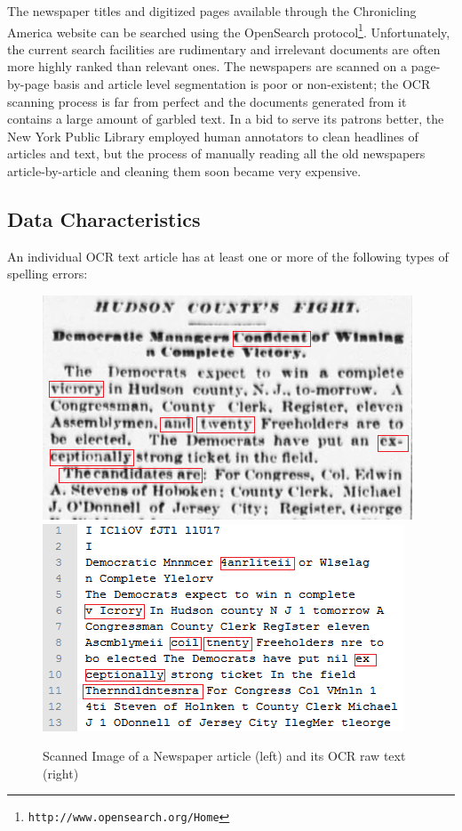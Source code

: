 \documentclass[12pt]{article}
\begin{document}
The newspaper titles and digitized pages available through the
Chronicling America website can be searched using the OpenSearch
protocol\footnote{\texttt{http://www.opensearch.org/Home}}.
Unfortunately, the current search facilities are rudimentary and
irrelevant documents are often more highly ranked than relevant ones.
The newspapers are scanned on a page-by-page basis and article level
segmentation is poor or non-existent; the OCR scanning process is far
from perfect and the documents generated from it contains a large
amount of garbled text. In a bid to serve its patrons better, the New
York Public Library employed human annotators to clean headlines of
articles and text, but the process of manually reading all the old
newspapers article-by-article and cleaning them soon became very
expensive. 

\subsection{Data Characteristics}
An individual OCR text article has at least one or more of the following types of spelling errors:

\begin{figure}[hbt]
\includegraphics[scale=0.75]{originalimage}
\includegraphics[scale=0.80]{ocr}
\caption{Scanned Image of a Newspaper article (left) and its OCR raw text (right)}
\label{figure:1}
\end{figure}
\end{document}
